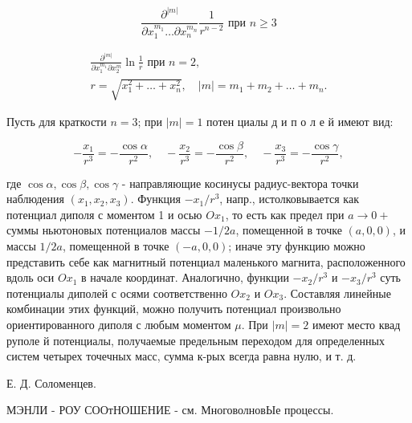 \documentclass[10pt]{article}
\begin{document}
\[

\frac{\partial^{|m|}}{\partial x_{1}^{m_{1}} \ldots \partial x_{n}^{m_{n}}} \frac{1}{r^{n-2}} \text { при } n \geqslant 3

\]



\[

\begin{gathered}

\frac{\partial^{|m|}}{\partial x_{1}^{m_{1}} \partial x_{2}^{m}} \ln \frac{1}{r} \text { при } n=2, \\

r=\sqrt{x_{1}^{2}+\ldots+x_{n}^{2}}, \quad|m|=m_{1}+m_{2}+\ldots+m_{n} .

\end{gathered}

\]



Пусть для краткости $n=3$; при $|m|=1$ потен циалы д и п о л е й имеют вид:



\[

-\frac{x_{1}}{r^{3}}=-\frac{\cos \alpha}{r^{2}}, \quad-\frac{x_{2}}{r^{3}}=-\frac{\cos \beta}{r^{2}}, \quad-\frac{x_{3}}{r^{3}}=-\frac{\cos \gamma}{r^{2}},

\]



где $\cos \alpha, \cos \beta, \cos \gamma$ - направляющие косинусы радиус-вектора точки наблюдения $\left(x_{1}, x_{2}, x_{3}\right)$. Функция $-x_{1} / r^{3}$, напр., истолковывается как потенциал диполя с моментом 1 и осью $O x_{1}$, то есть как предел при $a \rightarrow 0+$ суммы ньютоновых потенциалов массы $-1 / 2 a$, помещенной в точке $(a, 0,0)$, и массы $1 / 2 a$, помещенной в точке $(-a, 0,0)$; иначе эту функцию можно представить себе как магнитный потенциал маленького магнита, расположенного вдоль оси $O x_{1}$ в начале координат. Аналогично, функции $-x_{2} / r^{3}$ и $-x_{3} / r^{3}$ суть потенциалы диполей с осями соответственно $O x_{2}$ и $O x_{3}$. Составляя линейные комбинации этих функций, можно получить потенциал произвольно ориентированного диполя с любым моментом $\mu$. При $|m|=2$ имеют место квад руполе й потенциалы, получаемые предельным переходом для определенных систем четырех точечных масс, сумма к-рых всегда равна нулю, и т. д.



Е. Д. Соломенцев.



МЭНЛИ - РОУ СООтНОШЕНИЕ - см. МноговолновЫе процессы.
\end{document}
